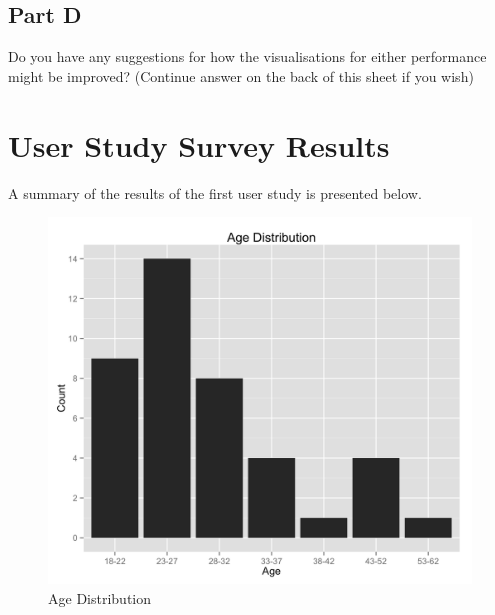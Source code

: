 \section*{Part D}

Do you have any suggestions for how the visualisations for either performance might be improved? (Continue answer on the back of this sheet if you wish)\\


\chapter{User Study Survey Results}

A summary of the results of the first user study is presented below.

\begin{figure}
    \centering
    \includegraphics[width=1.0\linewidth]{../study-2/results/graphs/age.png}
    \caption{Age Distribution}
    \label{agedistribution}
\end{figure}


